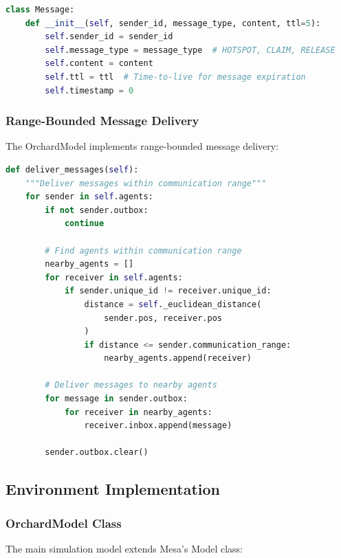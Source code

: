\documentclass[12pt,a4paper]{article}
\begin{document}
\begin{lstlisting}[language=Python, caption=Message Class Definition]
class Message:
    def __init__(self, sender_id, message_type, content, ttl=5):
        self.sender_id = sender_id
        self.message_type = message_type  # HOTSPOT, CLAIM, RELEASE
        self.content = content
        self.ttl = ttl  # Time-to-live for message expiration
        self.timestamp = 0
\end{lstlisting}

\subsubsection{Range-Bounded Message Delivery}

The OrchardModel implements range-bounded message delivery:

\begin{lstlisting}[language=Python, caption=Message Delivery System]
def deliver_messages(self):
    """Deliver messages within communication range"""
    for sender in self.agents:
        if not sender.outbox:
            continue

        # Find agents within communication range
        nearby_agents = []
        for receiver in self.agents:
            if sender.unique_id != receiver.unique_id:
                distance = self._euclidean_distance(
                    sender.pos, receiver.pos
                )
                if distance <= sender.communication_range:
                    nearby_agents.append(receiver)

        # Deliver messages to nearby agents
        for message in sender.outbox:
            for receiver in nearby_agents:
                receiver.inbox.append(message)

        sender.outbox.clear()
\end{lstlisting}

\subsection{Environment Implementation}

\subsubsection{OrchardModel Class}

The main simulation model extends Mesa's Model class:
\end{document}
